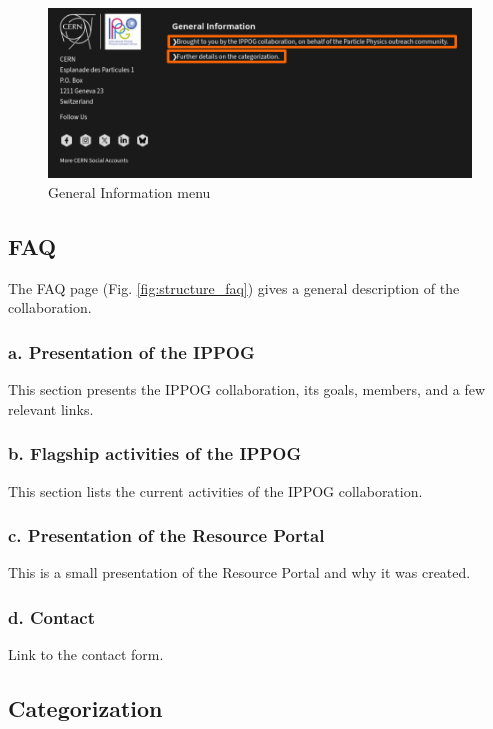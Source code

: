 \smallskip

\begin{figure}[h!]
    \centering
    \includegraphics[width=.9\linewidth]{Image/Architecture/structure_general_info.png}
    \caption{General Information menu}
    \label{fig:structure_general_info}
\end{figure}

\subsection{FAQ}\label{ssec:structure_FAQ}

The FAQ page (Fig. \ref{fig:structure_faq}) gives a general description of the collaboration.

\subsubsection*{a. Presentation of the IPPOG}
This section presents the IPPOG collaboration, its goals, members, and a few relevant links.

\subsubsection*{b. Flagship activities of the IPPOG}
This section lists the current activities of the IPPOG collaboration.

\subsubsection*{c. Presentation of the Resource Portal}
This is a small presentation of the Resource Portal and why it was created.

\subsubsection*{d. Contact}
Link to the contact form.

\subsection{Categorization}\label{ssec:structure_Categorization}

